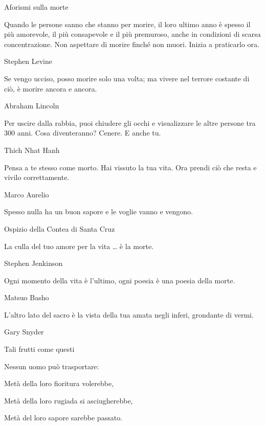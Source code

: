 \documentclass[12pt]{book} %
\begin{document}
\begin{mdframed}[linewidth=1pt]
Aforismi sulla morte


\bigskip

Quando le persone sanno che stanno per morire, il loro ultimo anno è spesso il più amorevole, il più consapevole e il
più premuroso, anche in condizioni di scarsa concentrazione. Non aspettare di morire finché non muori. Inizia a
praticarlo ora.

Stephen Levine


\bigskip

Se vengo ucciso, posso morire solo una volta; ma vivere nel terrore costante di ciò, è morire ancora e ancora.

Abraham Lincoln 


\bigskip

Per uscire dalla rabbia, puoi chiudere gli occhi e visualizzare le altre persone tra 300 anni. Cosa diventeranno?
Cenere. E anche tu.

Thich Nhat Hanh


\bigskip

Pensa a te stesso come morto. Hai vissuto la tua vita. Ora prendi ciò che resta e vivilo correttamente.

Marco Aurelio


\bigskip

Spesso nulla ha un buon sapore e le voglie vanno e vengono.

Ospizio della Contea di Santa Cruz


\bigskip

La culla del tuo amore per la vita … è la morte.

Stephen Jenkinson


\bigskip

Ogni momento della vita è l'ultimo, ogni poesia è una poesia della morte.

Matsuo Basho


\bigskip

L'altro lato del sacro è la vista della tua amata negli inferi, grondante di vermi.

Gary Snyder


\bigskip

Tali frutti come questi 

Nessun uomo può trasportare: 

Metà della loro fioritura volerebbe, 

Metà della loro rugiada si asciugherebbe, 

Metà del loro sapore sarebbe passato. 


\end{mdframed}
\end{document}
